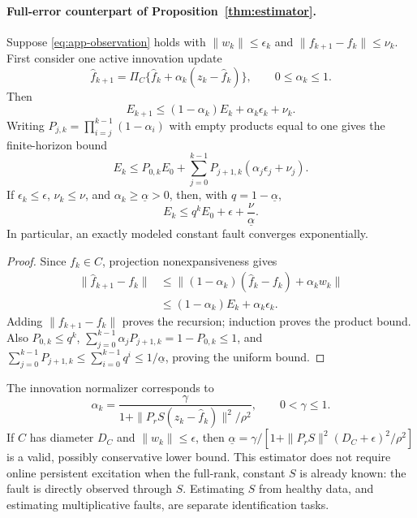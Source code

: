 \paragraph{Full-error counterpart of Proposition~\ref{thm:estimator}.}
Suppose \eqref{eq:app-observation} holds with $\|w_k\|\le\epsilon_k$ and
$\|f_{k+1}-f_k\|\le \nu_k$. First consider one active innovation update
\begin{equation}
 \widehat f_{k+1}=\Pi_C\{\widehat f_k+\alpha_k(z_k-\widehat f_k)\},
 \qquad 0\le\alpha_k\le1.
 \label{eq:app-innovation}
\end{equation}
Then
\begin{equation}
 E_{k+1}\le(1-\alpha_k)E_k+\alpha_k\epsilon_k+\nu_k.
 \label{eq:app-estimator-recursion}
\end{equation}
Writing $P_{j,k}=\prod_{i=j}^{k-1}(1-\alpha_i)$ with empty products equal to
one gives the finite-horizon bound
\begin{equation}
 E_k\le P_{0,k}E_0+
 \sum_{j=0}^{k-1}P_{j+1,k}(\alpha_j\epsilon_j+\nu_j).
 \label{eq:app-estimator-product}
\end{equation}
If $\epsilon_k\le\epsilon$, $\nu_k\le\nu$, and
$\alpha_k\ge\underline\alpha>0$, then, with $q=1-\underline\alpha$,
\begin{equation}
 E_k\le q^k E_0+\epsilon+\frac{\nu}{\underline\alpha}.
 \label{eq:app-estimator-uniform}
\end{equation}
In particular, an exactly modeled constant fault converges exponentially.
\begin{proof}
Since $f_k\in C$, projection nonexpansiveness gives
\begin{align*}
 \|\widehat f_{k+1}-f_k\|
 &\le\|(1-\alpha_k)(\widehat f_k-f_k)+\alpha_k w_k\|\\
 &\le(1-\alpha_k)E_k+\alpha_k\epsilon_k.
\end{align*}
Adding $\|f_{k+1}-f_k\|$ proves the recursion; induction proves the product
bound. Also $P_{0,k}\le q^k$,
$\sum_{j=0}^{k-1}\alpha_jP_{j+1,k}=1-P_{0,k}\le1$, and
$\sum_{j=0}^{k-1}P_{j+1,k}\le\sum_{i=0}^{k-1}q^i
\le1/\underline\alpha$, proving the uniform bound.
\end{proof}

The innovation normalizer corresponds to
\begin{equation}
 \alpha_k=\frac{\gamma}{1+\|P_rS(z_k-\widehat f_k)\|^2/\rho^2},
 \qquad 0<\gamma\le1.
 \label{eq:app-alpha}
\end{equation}
If $C$ has diameter $D_C$ and $\|w_k\|\le\epsilon$, then
$\underline\alpha=\gamma/[1+\|P_rS\|^2(D_C+\epsilon)^2/\rho^2]$ is a
valid, possibly conservative lower bound. This estimator does not require
online persistent excitation when the full-rank, constant $S$ is already
known: the fault is directly observed through $S$. Estimating $S$ from healthy
data, and estimating multiplicative faults, are separate identification tasks.

